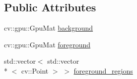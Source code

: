 \subsection*{Public Attributes}
\begin{DoxyCompactItemize}
\item 
cv\-::gpu\-::\-Gpu\-Mat \hyperlink{classcv_1_1gpu_1_1FGDStatModel_a5338d077962abc68f3bdf86dbfdf7fb5}{background}
\item 
cv\-::gpu\-::\-Gpu\-Mat \hyperlink{classcv_1_1gpu_1_1FGDStatModel_a45433418635a48e18f1faefca63b2d19}{foreground}
\item 
std\-::vector$<$ std\-::vector\\*
$<$ cv\-::\-Point $>$ $>$ \hyperlink{classcv_1_1gpu_1_1FGDStatModel_a8ebaaacff6c039db9c53d60640102243}{foreground\-\_\-regions}
\end{DoxyCompactItemize}


